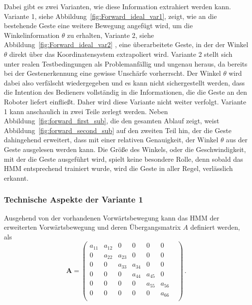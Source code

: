 Dabei gibt es zwei Varianten, wie diese Information extrahiert werden kann. Variante 1, siehe Abbildung~\ref{fig:Forward_ideal_var1}, zeigt, wie an die bestehende Geste eine weitere Bewegung angef\"ugt wird, um die Winkelinformation $\theta$ zu erhalten, Variante 2, siehe Abbildung~\ref{fig:Forward_ideal_var2} , eine \"uberarbeitete Geste, in der der Winkel $\theta$ direkt \"uber das Koordinatensystem extrapoliert wird.
\newline
Variante 2 stellt sich unter realen Testbedingungen als Problemanf\"allig und ungenau heraus, da bereits bei der Gestenerkennung eine gewisse Unsch\"arfe vorherrscht. Der Winkel $\theta$ wird dabei also verf\"alscht wiedergegeben und es kann nicht sichergestellt werden, dass die Intention des Bedieners vollst\"andig in die Informationen, die die Geste an den Roboter liefert einflie\ss t. Daher wird diese Variante nicht weiter verfolgt.
\newline
Variante 1 kann anschaulich in zwei Teile zerlegt werden. Neben Abbildung~\ref{fig:forward_first_sub}, die den gesamten Ablauf zeigt, weist Abbildung~\ref{fig:forward_second_sub} auf den zweiten Teil hin, der die Geste dahingehend erweitert, dass mit einer relativen Genauigkeit, der Winkel $\theta$ aus der Geste ausgelesen werden kann. Die Gr\"o\ss e des Winkels, oder die Geschwindigkeit, mit der die Geste ausgef\"uhrt wird, spielt keine besondere Rolle, denn sobald das \acrshort{HMM} entsprechend trainiert wurde, wird die Geste in aller Regel, verl\"asslich erkannt.

\subsubsection{Technische Aspekte der Variante 1}
Ausgehend von der vorhandenen Vorw\"artsbewegung kann das \acrshort{HMM} der erweiterten 
Vorw\"artsbewegung und deren \"Ubergangsmatrix $A$ definiert werden, als
\begin{equation}
\mathbf{A} = 
\begin{pmatrix}
a_{11} & a_{12} & 0 & 0 & 0 & 0 & \\
0 & a_{22} & a_{23} & 0 & 0 & 0 & \\
0 & 0 & a_{33} & a_{34} & 0 & 0 & \\
0 & 0 & 0 & a_{44} & a_{45} & 0 & \\
0 & 0 & 0 & 0 & a_{55} & a_{56} & \\
0 & 0 & 0 & 0 & 0 & a_{66} \\
\end{pmatrix} \, .
\end{equation}

